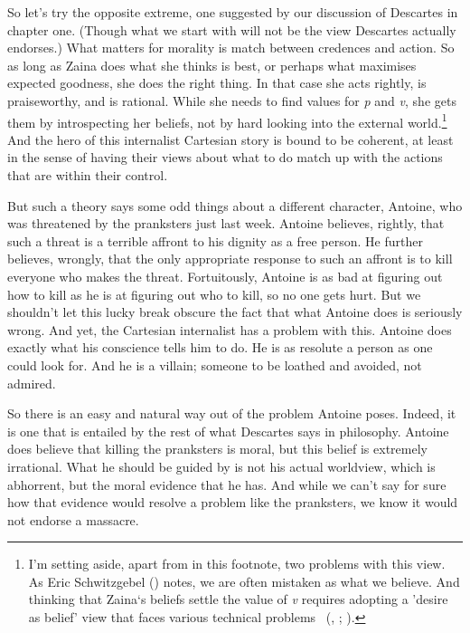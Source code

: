 \documentclass[
  10pt,
  letterpaper,
  twoside]{scrbook}
\begin{document}
So let's try the opposite extreme, one suggested by our discussion of
Descartes in chapter one. (Though what we start with will not be the
view Descartes actually endorses.) What matters for morality is match
between credences and action. So as long as {Zaina} does what she thinks
is best, or perhaps what maximises expected goodness, she does the right
thing. In that case she acts rightly, is praiseworthy, and is rational.
While she needs to find values for \emph{p} and \emph{v}, she gets them
by introspecting her beliefs, not by hard looking into the external
world.\footnote{I'm setting aside, apart from in this footnote, two
  problems with this view. As Eric Schwitzgebel
  () notes, we are often mistaken
  as what we believe. And thinking that {Zaina}`s beliefs settle the
  value of \emph{v} requires adopting a 'desire as belief' view that
  faces various technical problems ~(, ;
  ).} And the hero of this internalist Cartesian story is bound to
be coherent, at least in the sense of having their views about what to
do match up with the actions that are within their control.

But such a theory says some odd things about a different character,
{Antoine}, who was threatened by the pranksters just last week.
{Antoine} believes, rightly, that such a threat is a terrible affront to
his dignity as a free person. He further believes, wrongly, that the
only appropriate response to such an affront is to kill everyone who
makes the threat. Fortuitously, {Antoine} is as bad at figuring out how
to kill as he is at figuring out who to kill, so no one gets hurt. But
we shouldn't let this lucky break obscure the fact that what {Antoine}
does is seriously wrong. And yet, the Cartesian internalist has a
problem with this. {Antoine} does exactly what his conscience tells him
to do. He is as resolute a person as one could look for. And he is a
villain; someone to be loathed and avoided, not admired.

So there is an easy and natural way out of the problem {Antoine} poses.
Indeed, it is one that is entailed by the rest of what Descartes says in
philosophy. {Antoine} does believe that killing the pranksters is moral,
but this belief is extremely irrational. What he should be guided by is
not his actual worldview, which is abhorrent, but the moral evidence
that he has. And while we can't say for sure how that evidence would
resolve a problem like the pranksters, we know it would not endorse a
massacre.
\end{document}
